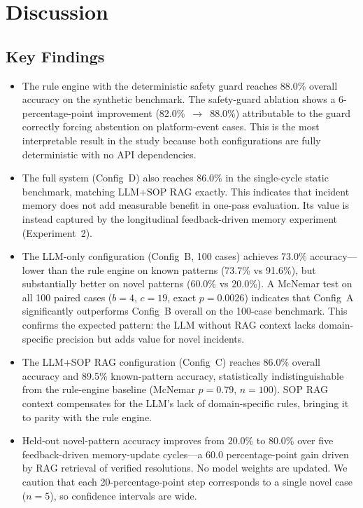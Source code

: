 \documentclass[a4paper,10pt,journal,compsoc]{IEEEtran}
\begin{document}
\section{Discussion}

\subsection{Key Findings}

\begin{itemize}
\item The rule engine with the deterministic safety guard reaches
  88.0\% overall accuracy on the synthetic benchmark. The safety-guard
  ablation shows a 6-percentage-point improvement
  (82.0\%~$\to$~88.0\%) attributable to the guard correctly forcing
  abstention on platform-event cases. This is the most interpretable
  result in the study because both configurations are fully
  deterministic with no API dependencies.

\item The full system (Config~D) also reaches 86.0\% in the
  single-cycle static benchmark, matching LLM+SOP RAG exactly. This
  indicates that incident memory does not add measurable benefit in
  one-pass evaluation. Its value is instead captured by the
  longitudinal feedback-driven memory experiment (Experiment~2).

\item The LLM-only configuration (Config~B, 100 cases) achieves 73.0\%
  accuracy---lower than the rule engine on known patterns (73.7\% vs
  91.6\%), but substantially better on novel patterns (60.0\% vs
  20.0\%). A McNemar test on all 100 paired cases ($b=4$, $c=19$,
  exact $p=0.0026$) indicates that Config~A significantly outperforms
  Config~B overall on the 100-case benchmark.
  This confirms the expected pattern: the LLM without RAG context
  lacks domain-specific precision but adds value for novel incidents.

\item The LLM+SOP RAG configuration (Config~C) reaches 86.0\% overall
  accuracy and 89.5\% known-pattern accuracy, statistically
  indistinguishable from the rule-engine baseline (McNemar $p=0.79$,
  $n=100$). SOP RAG context compensates for the LLM's lack
  of domain-specific rules, bringing it to parity with the rule engine.

\item Held-out novel-pattern accuracy improves from 20.0\% to 80.0\%
  over five feedback-driven memory-update cycles---a 60.0
  percentage-point gain driven by RAG retrieval of verified resolutions.
  No model weights are updated. We caution that each 20-percentage-point
  step corresponds to a single novel case ($n = 5$), so confidence
  intervals are wide.


\end{itemize}
\end{document}
